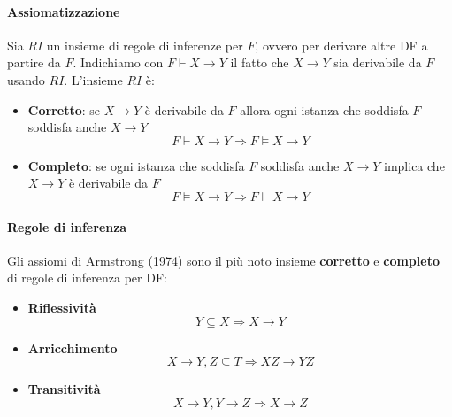 \paragraph{Assiomatizzazione}
Sia $RI$ un insieme di regole di inferenze per $F$, ovvero per derivare altre DF a partire da $F$. Indichiamo con $F \vdash X \to Y$ il fatto che $X \to Y$ sia derivabile da $F$ usando $RI$. L'insieme $RI$ è:
\begin{itemize}
	\item \textbf{Corretto}: se $X \to Y$ è derivabile da $F$ allora ogni istanza che soddisfa $F$ soddisfa anche $X \to Y$
	\begin{equation*}
		F \vdash X \to Y \Longrightarrow F \models X \to Y
	\end{equation*}
	\item \textbf{Completo}: se ogni istanza che soddisfa $F$ soddisfa anche $X \to Y$ implica che $X \to Y$ è derivabile da $F$
	\begin{equation*}
		F \models X \to Y \Longrightarrow F \vdash X \to Y
	\end{equation*}
\end{itemize}

\paragraph{Regole di inferenza}
Gli assiomi di Armstrong (1974) sono il più noto insieme \textbf{corretto} e \textbf{completo} di regole di inferenza per DF:
\begin{itemize}
	\item \textbf{Riflessività}
	\begin{equation}
		Y \subseteq X \Longrightarrow X \to Y
	\end{equation}
	\item \textbf{Arricchimento}
	\begin{equation}
		X \to Y, Z \subseteq T \Longrightarrow XZ \to YZ
	\end{equation}
	\item \textbf{Transitività}
	\begin{equation}
		X \to Y, Y \to Z \Longrightarrow X \to Z
	\end{equation}
\end{itemize} 

